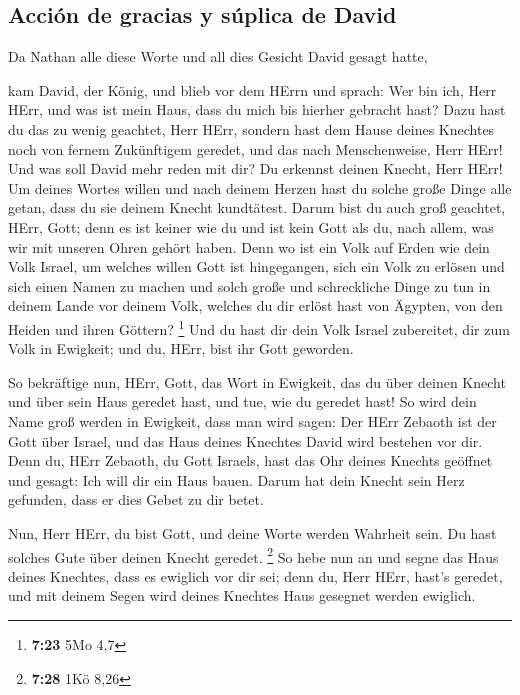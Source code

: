 \hypertarget{acciuxf3n-de-gracias-y-suxfaplica-de-david}{%
\subsection{Acción de gracias y súplica de
David}\label{acciuxf3n-de-gracias-y-suxfaplica-de-david}}

 Da Nathan alle diese Worte und all dies Gesicht David
gesagt hatte,

 kam David, der König, und blieb vor dem HErrn und
sprach: Wer bin ich, Herr HErr, und was ist mein Haus, dass du mich bis
hierher gebracht hast?  Dazu hast du das zu wenig
geachtet, Herr HErr, sondern hast dem Hause deines Knechtes noch von
fernem Zukünftigem geredet, und das nach Menschenweise, Herr HErr!
 Und was soll David mehr reden mit dir? Du erkennst
deinen Knecht, Herr HErr!  Um deines Wortes willen und
nach deinem Herzen hast du solche große Dinge alle getan, dass du sie
deinem Knecht kundtätest.  Darum bist du auch groß
geachtet, HErr, Gott; denn es ist keiner wie du und ist kein Gott als
du, nach allem, was wir mit unseren Ohren gehört haben. 
Denn wo ist ein Volk auf Erden wie dein Volk Israel, um welches willen
Gott ist hingegangen, sich ein Volk zu erlösen und sich einen Namen zu
machen und solch große und schreckliche Dinge zu tun in deinem Lande vor
deinem Volk, welches du dir erlöst hast von Ägypten, von den Heiden und
ihren Göttern? \footnote{\textbf{7:23} 5Mo 4,7}  Und du
hast dir dein Volk Israel zubereitet, dir zum Volk in Ewigkeit; und du,
HErr, bist ihr Gott geworden.

 So bekräftige nun, HErr, Gott, das Wort in Ewigkeit, das
du über deinen Knecht und über sein Haus geredet hast, und tue, wie du
geredet hast!  So wird dein Name groß werden in Ewigkeit,
dass man wird sagen: Der HErr Zebaoth ist der Gott über Israel, und das
Haus deines Knechtes David wird bestehen vor dir.  Denn
du, HErr Zebaoth, du Gott Israels, hast das Ohr deines Knechts geöffnet
und gesagt: Ich will dir ein Haus bauen. Darum hat dein Knecht sein Herz
gefunden, dass er dies Gebet zu dir betet.

 Nun, Herr HErr, du bist Gott, und deine Worte werden
Wahrheit sein. Du hast solches Gute über deinen Knecht geredet.
\footnote{\textbf{7:28} 1Kö 8,26}  So hebe nun an und
segne das Haus deines Knechtes, dass es ewiglich vor dir sei; denn du,
Herr HErr, hast's geredet, und mit deinem Segen wird deines Knechtes
Haus gesegnet werden ewiglich.


